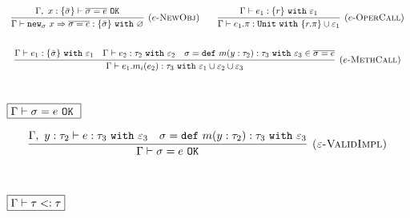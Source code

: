 \documentclass{llncs}
\newcommand{\keywadj}[1]{\mathtt{#1}}
\newcommand{\keyw}[1]{\keywadj{#1}~}
\newcommand{\kwa}[1]{\keywadj{ #1 }}
\begin{document}
\[
\begin{array}{c}

\infer[\textsc{($e$-NewObj)}]
	{\Gamma \vdash \kwa{new}_\sigma~x \Rightarrow \overline{\sigma = e} : \{ \bar \sigma \}~\keyw{with} \varnothing}
	{\Gamma,~x : \{ \bar \sigma \} \vdash \overline{\sigma = e}~\keywadj{OK}} ~~~~~~

\infer[\textsc{($e$-OperCall)}]
	{\Gamma \vdash e_1.\pi : \keyw{Unit} \keyw{with} \{ r.\pi \} \cup \varepsilon_1}
	{\Gamma \vdash e_1 : \{ r \}~ \keyw{with} \varepsilon_1} \\[5ex]
	
\infer[\textsc{($e$-MethCall)}]
	{\Gamma \vdash e_{1}.m_i(e_{2}):\tau_{3}~\keyw{with} \varepsilon_1 \cup \varepsilon_2 \cup \varepsilon_3}
	{\Gamma \vdash e_{1} : \{ \bar \sigma \}~\keyw{with} \varepsilon_1 & \Gamma \vdash e_{2} : \tau_{2}~\keyw{with} \varepsilon_2 & \sigma = \keyw{def} m(y:\tau_{2}):\tau_{3}~\keyw{with} \varepsilon_3 \in \overline{\sigma = e}} \\[5ex]
\end{array}
\]

\noindent
$\fbox{$\Gamma \vdash \sigma = e~\keyw{OK}$}$

\[
\begin{array}{c}
\infer[\textsc{($\varepsilon$-ValidImpl)}]
	{\Gamma \vdash \sigma = e~\keywadj{OK}}
	{\Gamma,~y:\tau_{2} \vdash e: \tau_{3}~\keyw{with} \varepsilon_3 & \sigma = \keyw{def} m(y:\tau_{2}):\tau_{3}~\keyw{with} \varepsilon_3} \\[5ex]
\end{array}
\]



\noindent
$\fbox{$\Gamma \vdash \tau <: \tau$}$
\end{document}
